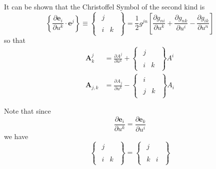 It can be shown that the Christoffel Symbol of the second kind is 
\begin{equation}
\left\{ \frac{\partial \mathbf{e}_{i}}{\partial u^{k}}\cdot \mathbf{e}%
^{j}\right\} \equiv \left\{ 
\begin{array}{l}
\begin{array}{ll}
j & \ 
\end{array}
\\ 
\begin{array}{ll}
i & k%
\end{array}%
\end{array}%
\right\} =\frac{1}{2}g^{jn}\left[ \frac{\partial g_{ni}}{\partial u^{k}}+%
\frac{\partial g_{nk}}{\partial u^{i}}-\frac{\partial g_{ik}}{\partial u^{n}}%
\right]  \label{chris}
\end{equation}%
so that 
\begin{align}
\mathbf{A}_{k}^{j}& =\frac{\partial A^{j}}{\partial u^{k}}+\left\{ 
\begin{array}{l}
\begin{array}{ll}
j & \ 
\end{array}
\\ 
\begin{array}{ll}
i & k%
\end{array}%
\end{array}%
\right\} A^{i} \\
\mathbf{A}_{j,k}& =\frac{\partial A_{j}}{\partial u^{k}}-\left\{ 
\begin{array}{l}
\begin{array}{ll}
i & \ 
\end{array}
\\ 
\begin{array}{ll}
j & k%
\end{array}%
\end{array}%
\right\} A_{i}
\end{align}

Note that since 
\begin{equation}
\frac{\partial \mathbf{e}_{i}}{\partial u^{k}}=\frac{\partial \mathbf{e}_{k}%
}{\partial u^{i}}
\end{equation}%
we have 
\begin{equation}
\left\{ 
\begin{array}{l}
\begin{array}{ll}
j & \ 
\end{array}
\\ 
\begin{array}{ll}
i & k%
\end{array}%
\end{array}%
\right\} =\left\{ 
\begin{array}{l}
\begin{array}{ll}
j & \ 
\end{array}
\\ 
\begin{array}{ll}
k & i%
\end{array}%
\end{array}%
\right\}
\end{equation}

